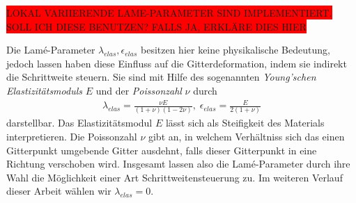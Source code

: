\documentclass[bibliography=totoc,12pt,a4paper]{scrartcl}
\theoremstyle{exampstyle}
\numberwithin{equation}{section}
\begin{document}
\colorbox{red}{LOKAL VARIIERENDE LAME-PARAMETER SIND IMPLEMENTIERT. SOLL ICH DIESE BENUTZEN? FALLS JA, ERKLÄRE DIES HIER}

Die Lamé-Parameter $\lambda_{elas}, \epsilon_{elas}$ besitzen hier keine physikalische Bedeutung, jedoch lassen haben diese Einfluss auf die Gitterdeformation, indem sie indirekt die Schrittweite steuern. Sie sind mit Hilfe des sogenannten \textit{Young'schen Elastizitätsmoduls} $E$ und der \textit{Poissonzahl} $\nu$ durch
\begin{align*}
	\lambda_{elas} = \frac{\nu E}{(1+\nu)(1-2\nu)}, \; 
	\epsilon_{elas} = \frac{E}{2(1+\nu)}
\end{align*}
darstellbar. Das Elastizitätsmodul $E$ lässt sich als Steifigkeit des Materials interpretieren. Die Poissonzahl $\nu$ gibt an, in welchem Verhältniss sich das einen Gitterpunkt umgebende Gitter ausdehnt, falls dieser Gitterpunkt in eine Richtung verschoben wird. Insgesamt lassen also die Lamé-Parameter durch ihre Wahl die Möglichkeit einer Art Schrittweitensteuerung zu. Im weiteren Verlauf dieser Arbeit wählen wir $\lambda_{elas} = 0$.
\end{document}

